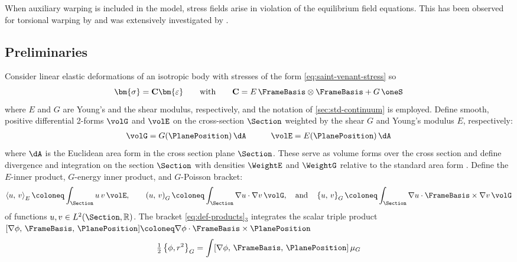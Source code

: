 When auxiliary warping is included in the model, stress fields arise in violation of the equilibrium field equations.%
This has been observed for torsional warping by \cite{...} and was extensively investigated by \cite{armero2021modeling}. 

\subsection{Preliminaries}

\iftrue
Consider linear elastic deformations of an isotropic body with stresses of the form \eqref{eq:saint-venant-stress} so 
\begin{equation*}
    \bm{\sigma} = \mathbf{C}\bm{\varepsilon}
    \qquad\text{with}\qquad 
    \mathbf{C} = E \, \FrameBasis \otimes \FrameBasis + G \, \oneS
\end{equation*}
where \(E\) and \(G\) are Young's and the shear modulus, respectively, and the notation of \cref{sec:std-continuum} is employed. 
Define smooth, positive differential 2-forms \( \volG \) and \( \volE \)  on the cross-section \( \Section\) weighted by the shear \(G\) and Young's modulus \(E\), respectively:
\[
\begin{aligned}
    \volG &= G(\PlanePosition)\,\dA
    &\qquad
    \volE &= E(\PlanePosition)\,\dA \\
\end{aligned}
\]
where \(\dA\) is the Euclidean area form in the cross section plane \(\Section\). 
These serve as volume forms over the cross section and define divergence and  integration on the section $\Section$ with densities $\WeightE$ and $\WeightG$ relative to the standard area form \citep{marsden1994mathematical}. 
Define the \(E\)-inner product, \(G\)-energy inner product, and \(G\)-Poisson bracket:
\begin{equation}
\left<u,\, v\right>_E \coloneq \int_{\Section} u \, v \, \volE,
\qquad
\left(u,\, v\right)_G \coloneq \int_{\Section} \nabla u \cdot \nabla v \, \volG,
\quad \text{and}\quad 
\left\{u,\, v\right\}_G \coloneq \int_{\Section} \nabla u \cdot \FrameBasis \times \nabla v\, \volG
\label{eq:def-products}
\end{equation}
of functions \(u,v\in L^{2}(\Section,\mathbb{R})\). 
The bracket \eqref{eq:def-products}$_3$ integrates the scalar triple product \([\nabla \phi,\, \FrameBasis,\, \PlanePosition] \coloneq \nabla \phi \cdot \FrameBasis \times \PlanePosition\)
\begin{equation*}
\tfrac{1}{2}\left\{\phi, r^2\right\}_G = \int [\nabla \phi,\, \FrameBasis,\, \PlanePosition]\, \mu_G
\end{equation*}
\fi 


